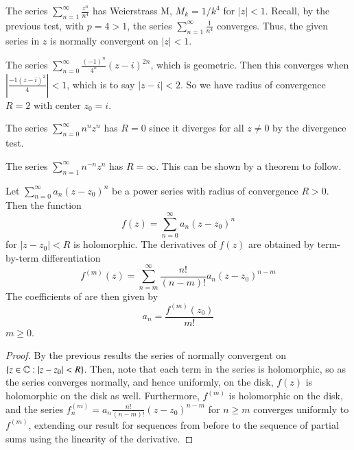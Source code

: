 \documentclass[12pt, a4paper, oneside, openright, titlepage]{book}
\begin{document}
\begin{eg}
    The series $\sum_{n=1}^{\infty}\frac{z^n}{n^4}$ has Weierstrass M, $M_k = 1/k^4$ for $|z| < 1$. Recall, by the previous test, with $p = 4 > 1$, the series $\sum_{n=1}^{\infty}\frac{1}{n^4}$ converges. Thus, the given series in $z$ is normally convergent on $|z| <1$.
\end{eg}

\begin{eg}
    The series $\sum_{n=0}^{\infty}\frac{(-1)^n}{4^n}(z-i)^{2n}$, which is geometric. Then this converges when $\left|\frac{-1(z-i)^2}{4}\right| < 1$, which is to say $|z-i| < 2$. So we have radius of convergence $R = 2$ with center $z_0 = i$.
\end{eg}

\begin{eg}
    The series $\sum_{n=0}^{\infty}n^nz^n$ has $R = 0$ since it diverges for all $z \neq 0$ by the divergence test.
\end{eg}
    

\begin{eg}
    The series $\sum_{n=1}^{\infty}n^{-n}z^n$ has $R = \infty$. This can be shown by a theorem to follow.
\end{eg}

\begin{thm}
    Let $\sum_{n=0}^{\infty}a_n(z-z_0)^n$ be a power series with radius of convergence $R > 0$. Then the function \begin{equation*}
        f(z) = \sum_{n=0}^{\infty}a_n(z-z_0)^n
    \end{equation*}
    for $|z-z_0| < R$ is holomorphic. The derivatives of $f(z)$ are obtained by term-by-term differentiation \begin{equation*}
        f^{(m)}(z) = \sum_{n=m}^{\infty}\frac{n!}{(n-m)!}a_n(z-z_0)^{n-m}
    \end{equation*}
    The coefficients of are then given by \begin{equation*}
        a_n = \frac{f^{(m)}(z_0)}{m!}
    \end{equation*}
    $m \geq 0$.
\end{thm}
\begin{proof}
    By the previous results the series of normally convergent on $\{z \in \mathbb C:|z-z_0| < R\}$. Then, note that each term in the series is holomorphic, so as the series converges normally, and hence uniformly, on the disk, $f(z)$ is holomorphic on the disk as well. Furthermore, $f^{(m)}$ is holomorphic on the disk, and the series $f_n^{(m)} = a_n\frac{n!}{(n-m)!}(z-z_0)^{n-m}$ for $n \geq m$ converges uniformly to $f^{(m)}$, extending our result for sequences from before to the sequence of partial sums using the linearity of the derivative. 
\end{proof}
\end{document}
